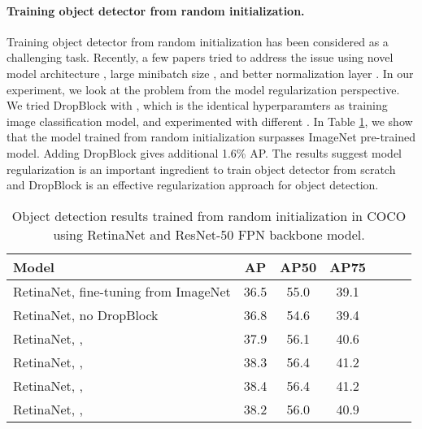 \documentclass{article}
\begin{document}
\paragraph{Training object detector from random initialization.}
Training object detector from random initialization has been considered as a challenging task. Recently, a few papers tried to address the issue using novel model architecture \cite{shen2017dsod}, large minibatch size \cite{peng2018dmegdet}, and better normalization layer \cite{wu2018gn}. In our experiment, we look at the problem from the model regularization perspective. We tried DropBlock with , which is the identical hyperparamters as training image classification model, and experimented with different . In Table \ref{table:retinanet}, we show that the model trained from random initialization surpasses ImageNet pre-trained model. Adding DropBlock gives additional 1.6\% AP. The results suggest model regularization is an important ingredient to train object detector from scratch and DropBlock is an effective regularization approach for object detection.

\begin{table}[h!]
\setlength{\tabcolsep}{8pt}
\begin{center}
\small
\begin{tabular}{l|cccccc}
\hline
  \footnotesize Model  & \footnotesize AP & \footnotesize AP50 & \footnotesize AP75 \\
\hline \hline
\footnotesize RetinaNet, fine-tuning from ImageNet & 36.5 & 55.0 & 39.1  \\
\hline
\footnotesize RetinaNet, no DropBlock            & 36.8 & 54.6 & 39.4 \\
\footnotesize RetinaNet, ,   & 37.9 & 56.1 & 40.6 \\
\footnotesize RetinaNet, ,   & 38.3 & 56.4 & 41.2 \\
\footnotesize RetinaNet, ,   & 38.4 & 56.4 & 41.2 \\
\footnotesize RetinaNet, ,   & 38.2 & 56.0 & 40.9 \\
\hline
\end{tabular}
\end{center}
\caption{Object detection results trained from random initialization in COCO using RetinaNet and ResNet-50 FPN backbone model.}
\label{table:retinanet}
\end{table}
\end{document}
